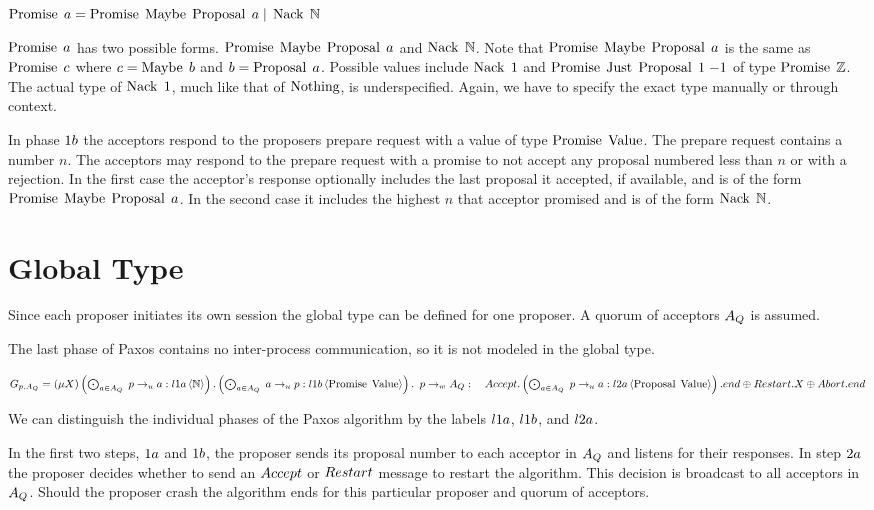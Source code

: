 $\operatorname{Promise}\; a = \operatorname{Promise}\; \operatorname{Maybe}\; \operatorname{Proposal}\; a \; | \; \operatorname{Nack}\; \mathbb{N}$

$\operatorname{Promise}\; a$ has two possible forms.
$\operatorname{Promise}\; \operatorname{Maybe}\; \operatorname{Proposal}\; a$ and $\operatorname{Nack}\; \mathbb{N}$.
Note that $\operatorname{Promise}\; \operatorname{Maybe}\; \operatorname{Proposal}\; a$ is the same as $\operatorname{Promise}\; c$ where $c = \operatorname{Maybe}\; b$ and $b = \operatorname{Proposal}\; a$.
Possible values include $\operatorname{Nack}\; 1$ and $\operatorname{Promise}\; \operatorname{Just}\; \operatorname{Proposal}\; 1\; {-1}$ of type $\operatorname{Promise}\; \mathbb{Z}$.
The actual type of $\operatorname{Nack}\; 1$, much like that of $\operatorname{Nothing}$, is underspecified.
Again, we have to specify the exact type manually or through context.

In phase $1b$ the acceptors respond to the proposers prepare request with a value of type $\operatorname{Promise}\; \operatorname{Value}$.
The prepare request contains a number $n$.
The acceptors may respond to the prepare request with a promise to not accept any proposal numbered less than $n$ or with a rejection.
In the first case the acceptor's response optionally includes the last proposal it accepted, if available, and is of the form $\operatorname{Promise}\; \operatorname{Maybe}\; \operatorname{Proposal}\; a$.
In the second case it includes the highest $n$ that acceptor promised and is of the form $\operatorname{Nack}\; \mathbb{N}$.

\section{Global Type}
Since each proposer initiates its own session the global type can be defined for one proposer.
A quorum of acceptors $A_Q$ is assumed.

The last phase of Paxos contains no inter-process communication, so it is not modeled in the global type.

$G_{p, A_Q} = \left(\mu X\right)
\left(\bigodot_{a \in A_Q}\;p \to_u a : l1a \left\langle \mathbb{N} \right\rangle\right) .
\left(\bigodot_{a \in A_Q}\;a \to_u p : l1b \left\langle \operatorname{Promise}\; \operatorname{Value} \right\rangle\right) .\\
\hspace*{0.5em}p \to_w A_Q : \\
\hspace*{1em}
\mathnormal{Accept}.\left(\bigodot_{a \in A_Q}\;p \to_u a : l2a \left\langle \operatorname{Proposal}\; \operatorname{Value} \right\rangle\right).end \oplus
\mathnormal{Restart}.X \oplus
\mathnormal{Abort}.end$

We can distinguish the individual phases of the Paxos algorithm by the labels $l1a$, $l1b$, and $l2a$.

In the first two steps, $1a$ and $1b$, the proposer sends its proposal number to each acceptor in $A_Q$ and listens for their responses.
In step $2a$ the proposer decides whether to send an $\mathnormal{Accept}$ or $\mathnormal{Restart}$ message to restart the algorithm.
This decision is broadcast to all acceptors in $A_Q$.
Should the proposer crash the algorithm ends for this particular proposer and quorum of acceptors.

